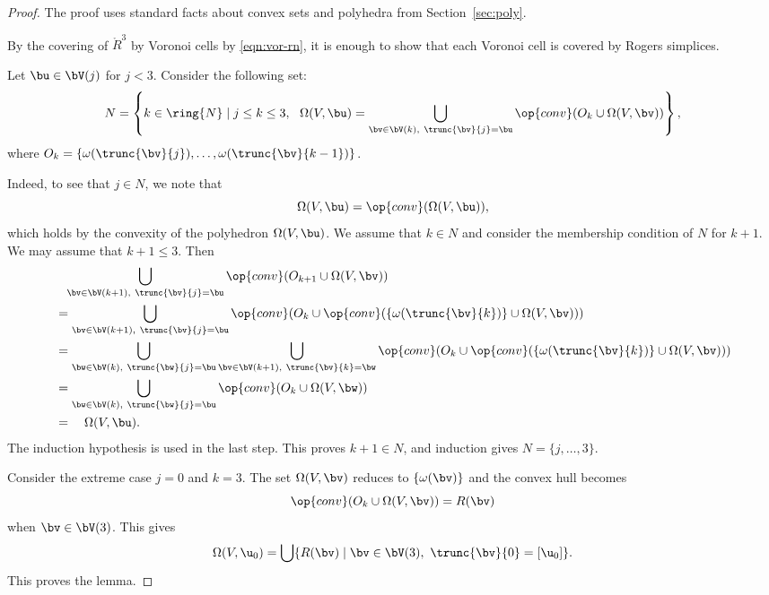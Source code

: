 \begin{proof} 
The proof uses standard facts about convex sets and polyhedra from
Section~\ref{sec:poly}.


%
By the covering of $\ring{R}^3$  by Voronoi cells by \eqref{eqn:vor-rn},
it is enough to show that each Voronoi cell is covered by Rogers
simplices.

Let $\bu\in \bV(j)$ for $j<3$.
Consider the following set:
\[  
N = \left\{k\in\ring{N}\mid j\le k\le 3, ~~\Omega(V,\bu) 
= \bigcup_{\bv \in \bV(k),~\trunc{\bv}{j}=\bu}
\op{conv}(O_k \cup\Omega(V,\bv)) %
\right\},
\] 
where $O_k = \{\omega(\trunc{\bv}{j}),\ldots,\omega(\trunc{\bv}{k-1})\}$.

  Indeed, to see that $j\in N$, we note that
\[  
\Omega(V,\bu) = \op{conv}(\Omega(V,\bu)),
\] 
which holds by the convexity of the polyhedron $\Omega(V,\bu)$.  We
assume that $k\in N$ and consider the membership condition of $N$ for
$k+1$.  We may assume that $k+1\le 3$.  Then
\begin{align*} 
&\phantom{=}\bigcup _{\bv \in \bV(k+1),~\trunc{\bv}{j}=\bu}
\op{conv}(O_{k+1} \cup\Omega(V,\bv))
%
\vspace{6pt}\\
&=\bigcup _{\bv \in \bV(k+1),~\trunc{\bv}{j}=\bu}
\op{conv}(O_{k} \cup\op{conv}(\{\omega(\trunc{\bv}{k})\}
\cup\Omega(V,\bv)))
\vspace{6pt}\\
&=\bigcup _{\bw\in \bV(k),~\trunc{\bw}{j}=\bu}
\bigcup_{\bv \in \bV(k+1),~\trunc{\bv}{k}=\bw}
\op{conv}(O_{k} \cup\op{conv}(\{\omega(\trunc{\bv}{k})\}
\cup\Omega(V,\bv)))
\vspace{6pt}\\
&=\bigcup _{\bw\in \bV(k),~\trunc{\bw}{j}=\bu}
\op{conv}(O_{k} \cup \Omega(V,\bw)    )
\vspace{6pt}\\
&=\quad\Omega(V,\bu).
\end{align*}
The induction hypothesis is used in the last step.  
This proves $k+1\in N$, and induction gives $N=\{j,\ldots,3\}$.

Consider the extreme case $j=0$ and $k=3$.  The set $\Omega(V,\bv)$
reduces to $\{\omega(\bv)\}$ and the convex hull becomes
\[  
\op{conv}(O_{k}\cup \Omega(V,\bv)) = R(\bv)
\] 
when $\bv\in \bV(3)$.
This gives
\begin{equation} 
\Omega(V,\u_0) = 
\bigcup \{ R(\bv) \mid \bv\in \bV(3),~\trunc{\bv}{0} =[\u_0]\}.
\end{equation}
This proves the lemma.
\end{proof}



